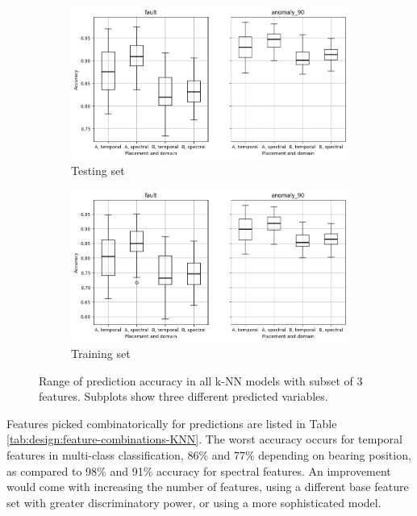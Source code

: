 \begin{figure}[ht]
    \centering
    \begin{subfigure}[b]{0.8\textwidth}
        \includegraphics[width=\textwidth]{assets/design/KNN-3-features-combinations-train.png}
        \caption{Testing set}
    \end{subfigure}
    \hfill
    \begin{subfigure}[b]{0.8\textwidth}
        \includegraphics[width=\textwidth]{assets/design/KNN-3-features-combinations-test.png}
        \caption{Training set}
    \end{subfigure}
    \caption{Range of prediction accuracy in all k-NN models with subset of 3 features. Subplots show three different predicted variables.}
    \label{fig:design:feature-combinations-KNN}
\end{figure}

Features picked combinatorically for predictions are listed in Table \ref{tab:design:feature-combinations-KNN}. The worst accuracy occurs for temporal features in multi-class classification, 86\% and 77\% depending on bearing position, as compared to 98\% and 91\% accuracy for spectral features. An improvement would come with increasing the number of features, using a different base feature set with greater discriminatory power, or using a more sophisticated model.

